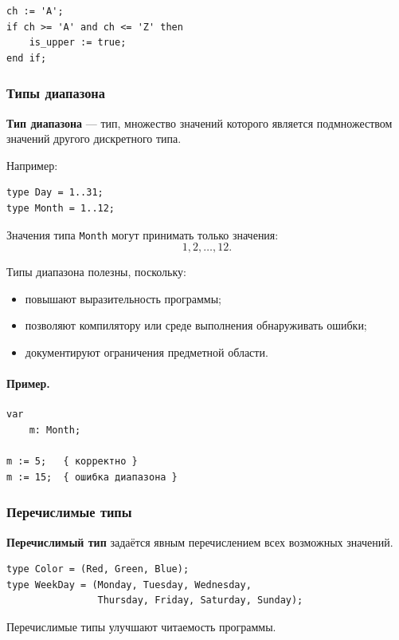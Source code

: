 \documentclass[12pt,a4paper]{article}
\begin{document}
\begin{verbatim}
ch := 'A';
if ch >= 'A' and ch <= 'Z' then
    is_upper := true;
end if;
\end{verbatim}

\subsubsection{Типы диапазона}

\textbf{Тип диапазона} --- тип, множество значений которого является подмножеством значений другого дискретного типа.

Например:

\begin{verbatim}
type Day = 1..31;
type Month = 1..12;
\end{verbatim}

Значения типа \texttt{Month} могут принимать только значения:
\[
    1,2,\dots,12.
\]

Типы диапазона полезны, поскольку:
\begin{itemize}
    \item повышают выразительность программы;
    \item позволяют компилятору или среде выполнения обнаруживать ошибки;
    \item документируют ограничения предметной области.
\end{itemize}

\paragraph{Пример.}

\begin{verbatim}
var
    m: Month;

m := 5;   { корректно }
m := 15;  { ошибка диапазона }
\end{verbatim}

\subsubsection{Перечислимые типы}

\textbf{Перечислимый тип} задаётся явным перечислением всех возможных значений.

\begin{verbatim}
type Color = (Red, Green, Blue);
type WeekDay = (Monday, Tuesday, Wednesday,
                Thursday, Friday, Saturday, Sunday);
\end{verbatim}

Перечислимые типы улучшают читаемость программы.
\end{document}
